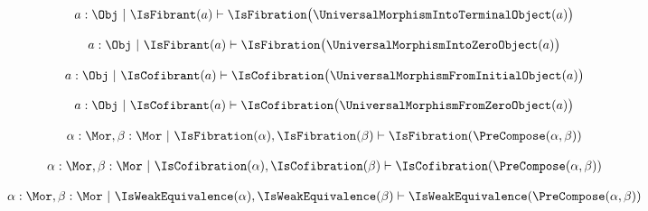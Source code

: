 \begin{sequent}
\begin{align*}
a: \Obj ~|~ \IsFibrant( a ) \vdash \IsFibration \big( \UniversalMorphismIntoTerminalObject( a ) \big)
\end{align*}
\end{sequent}

\begin{sequent}
\begin{align*}
a: \Obj ~|~ \IsFibrant( a ) \vdash \IsFibration \big( \UniversalMorphismIntoZeroObject( a ) \big)
\end{align*}
\end{sequent}

\begin{sequent}
\begin{align*}
a: \Obj ~|~ \IsCofibrant( a ) \vdash \IsCofibration \big( \UniversalMorphismFromInitialObject( a ) \big)
\end{align*}
\end{sequent}

\begin{sequent}
\begin{align*}
a: \Obj ~|~ \IsCofibrant( a ) \vdash \IsCofibration \big( \UniversalMorphismFromZeroObject( a ) \big)
\end{align*}
\end{sequent}

\begin{sequent}
\begin{align*}
\alpha: \Mor, \beta: \Mor ~|~ \IsFibration( \alpha ), \IsFibration( \beta ) \vdash \IsFibration( \PreCompose( \alpha, \beta ) ) 
\end{align*}
\end{sequent}

\begin{sequent}
\begin{align*}
\alpha: \Mor, \beta: \Mor ~|~ \IsCofibration( \alpha ), \IsCofibration( \beta ) \vdash \IsCofibration( \PreCompose( \alpha, \beta ) ) 
\end{align*}
\end{sequent}

\begin{sequent}
\begin{align*}
\alpha: \Mor, \beta: \Mor ~|~ \IsWeakEquivalence( \alpha ), \IsWeakEquivalence( \beta ) \vdash \IsWeakEquivalence( \PreCompose( \alpha, \beta ) ) 
\end{align*}
\end{sequent}

